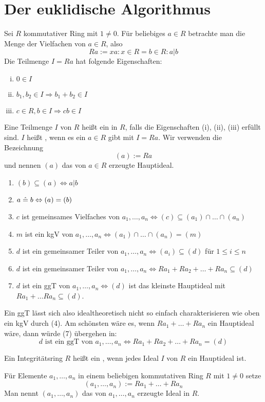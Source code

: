 \section{Der euklidische Algorithmus}
\label{sec:para2}
	Sei $R$ kommutativer Ring mit $1 \neq 0$. Für beliebiges $a \in R$ betrachte man die Menge der Vielfachen von $a \in R$, also
	\[ Ra := {xa : x \in R} = {b \in R : a|b} \]
	Die Teilmenge $I = Ra$ hat folgende Eigenschaften:
	\begin{enumerate}[(i)]
		\item $0 \in I$
		\item $b_1,b_2 \in I \Rightarrow b_1+b_2 \in I$
		\item $c \in R, b \in I \Rightarrow cb \in I$
	\end{enumerate}
	
\begin{defn} \label{def_2.1}
	Eine Teilmenge $I$ von $R$ heißt ein  in $R$, falls die Eigenschaften (i), (ii), (iii) erfüllt sind. $I$ heißt , wenn es ein $a \in R$ gibt mit $I = Ra$. Wir verwenden die Bezeichnung
	\[ (a) := Ra \]
	und nennen $(a)$ das von $a \in R$ erzeugte Hauptideal.
\end{defn}

	\begin{enumerate}[(1)]
		\item $(b) \subseteq (a) \Leftrightarrow a | b$
		\item $a \mathrel{\hat=} b \Leftrightarrow (a) = (b)$
		\item $c$ ist gemeinsames Vielfaches von $a_1,\dots,a_n \Leftrightarrow (c) \subseteq (a_1) \cap \dots \cap (a_n)$
		\item $m$ ist ein kgV von $a_1,\dots,a_n \Leftrightarrow (a_1) \cap \dots \cap (a_n) = (m)$
		\item $d$ ist ein gemeinsamer Teiler von $a_1,\dots,a_n \Leftrightarrow (a_i) \subseteq (d)$ für $1 \leq i \leq n$
		\item $d$ ist ein gemeinsamer Teiler von $a_1,\dots,a_n \Leftrightarrow Ra_1 + Ra_2 + \dots + Ra_n \subseteq (d)$
		\item $d$ ist ein ggT von $a_1,\dots,a_n \Leftrightarrow (d)$ ist das kleinste Hauptideal mit $Ra_1 + \dots Ra_n \subseteq (d)$.
	\end{enumerate}
	Ein ggT lässt sich also idealtheoretisch nicht so einfach charakterisieren wie oben ein kgV durch (4). Am schönsten wäre es, wenn $Ra_1 + \dots + Ra_n$ ein Hauptideal wäre, dann würde (7) übergehen in:
	\[ d \text{ ist ein ggT von } a_1,\dots,a_n \Leftrightarrow Ra_1+Ra_2+ \dots + Ra_n = (d) \]
	
\begin{defn}[Hauptidealring] \label{def_2.2}
	Ein Integritätsring $R$ heißt ein , wenn jedes Ideal $I$ von $R$ ein Hauptideal ist.
\end{defn}

	Für Elemente $a_1,\dots,a_n$ in einem beliebigen kommutativen Ring $R$ mit $1 \neq 0$ setze
	\[ (a_1,\dots,a_n) := Ra_1 + \dots + Ra_n \]
	Man nennt $(a_1,\dots,a_n)$ das von $a_1,\dots,a_n$ erzeugte Ideal in $R$.
\newpage